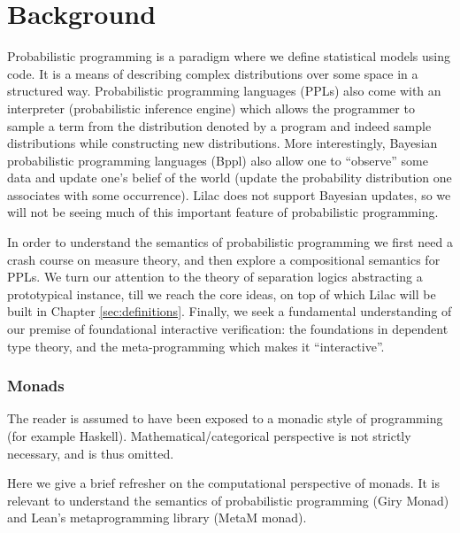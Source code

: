 \chapter{Background}

Probabilistic programming is a paradigm where we define statistical models using code. It is a means of describing
complex distributions over some space in a structured way. Probabilistic programming languages (PPLs) also come with an interpreter
(probabilistic inference engine) which allows the programmer to sample a term from the distribution denoted by a program
and indeed sample distributions while constructing new distributions.
 More interestingly, Bayesian probabilistic programming languages (Bppl) also allow one to ``observe'' some data and update
one's belief of the world (update the probability distribution one associates with some occurrence). Lilac does not support Bayesian
updates, so we will not be seeing much of this important feature of probabilistic programming.

In order to understand the semantics of probabilistic programming we first need a crash course on measure theory, and then explore a compositional
semantics for PPLs. We turn our attention to the theory of separation logics abstracting a prototypical instance, till we reach the core ideas,
on top of which Lilac will be built in Chapter \ref{sec:definitions}. Finally, we seek a fundamental understanding of our premise of foundational
interactive verification: the foundations in dependent type theory, and the meta-programming which makes it ``interactive''.



\subsection{Monads}
The reader is assumed to have been exposed to a monadic style of programming (for example Haskell). Mathematical/categorical perspective
is not strictly necessary, and is thus omitted.

Here we give a brief refresher on the computational perspective of monads. It is relevant to understand the semantics of probabilistic
programming (Giry Monad) and Lean's metaprogramming library (MetaM monad).

